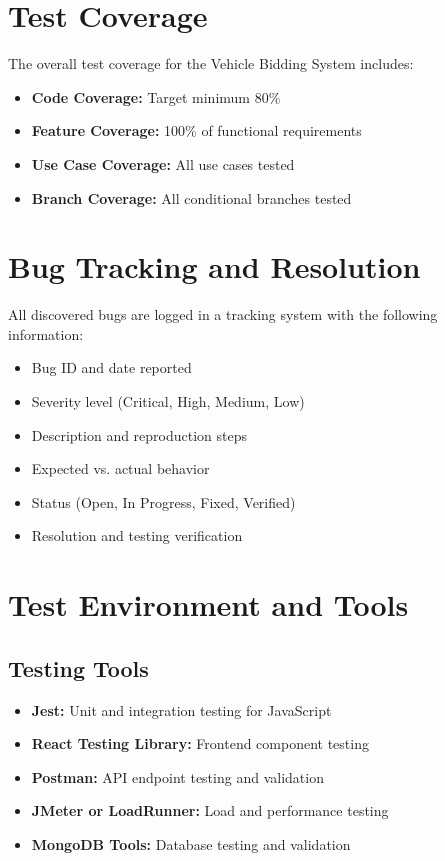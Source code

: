 \section{Test Coverage}

The overall test coverage for the Vehicle Bidding System includes:

\begin{itemize}
    \item \textbf{Code Coverage:} Target minimum 80\%
    \item \textbf{Feature Coverage:} 100\% of functional requirements
    \item \textbf{Use Case Coverage:} All use cases tested
    \item \textbf{Branch Coverage:} All conditional branches tested
\end{itemize}

\section{Bug Tracking and Resolution}

All discovered bugs are logged in a tracking system with the following information:

\begin{itemize}
    \item Bug ID and date reported
    \item Severity level (Critical, High, Medium, Low)
    \item Description and reproduction steps
    \item Expected vs. actual behavior
    \item Status (Open, In Progress, Fixed, Verified)
    \item Resolution and testing verification
\end{itemize}

\section{Test Environment and Tools}

\subsection{Testing Tools}
\begin{itemize}
    \item \textbf{Jest:} Unit and integration testing for JavaScript
    \item \textbf{React Testing Library:} Frontend component testing
    \item \textbf{Postman:} API endpoint testing and validation
    \item \textbf{JMeter or LoadRunner:} Load and performance testing
    \item \textbf{MongoDB Tools:} Database testing and validation
\end{itemize}

